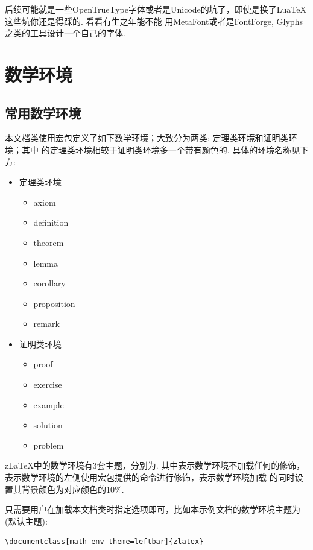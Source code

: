 后续可能就是一些OpenTrueType字体或者是Unicode的坑了，即使是换了Lua\TeX{}这些坑你还是得踩的. 看看有生之年能不能
用MetaFont或者是FontForge, Glyphs之类的工具设计一个自己的字体.

\section{数学环境}
\subsection{常用数学环境}\label{常用数学环境}
本文档类使用宏包定义了如下数学环境；大致分为两类: 定理类环境和证明类环境；其中 
的定理类环境相较于证明类环境多一个带有颜色的. 具体的环境名称见下方:

\begin{multicols}{2}
\begin{itemize}
    \item 定理类环境
        \begin{itemize}
        \item axiom
        \item definition
        \item theorem 
        \item lemma
        \item corollary 
        \item proposition
        \item remark 
        \end{itemize}
    \item 证明类环境
    \begin{itemize}
        \item proof
        \item exercise
        \item example
        \item solution
        \item problem
    \end{itemize}
\end{itemize}    
\end{multicols}

z\LaTeX{}中的数学环境有3套主题，分别为. 其中表示数学环境不加载任何的修饰，
表示数学环境的左侧使用宏包提供的命令进行修饰，表示数学环境加载
的同时设置其背景颜色为对应颜色的10\%. 

只需要用户在加载本文档类时指定选项即可，比如本示例文档的数学环境主题为(默认主题):
\begin{verbatim}
\documentclass[math-env-theme=leftbar]{zlatex}
\end{verbatim}

